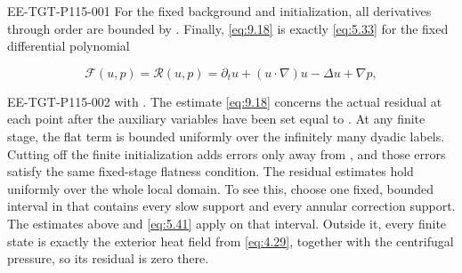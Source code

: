 %
\begin{EESegment}{EE-TGT-P115-001}
For the fixed background and initialization, all derivatives through order
 are bounded by
. Finally, \eqref{eq:9.18} is exactly
\eqref{eq:5.33} for the fixed differential polynomial
\end{EESegment}
\[
\mathcal F(u,p)=\mathscr R(u,p)=\partial_tu+(u\mathbin{\cdot}\nabla)u-\Delta u+\nabla p,
\]
\begin{EESegment}{EE-TGT-P115-002}
with . The estimate \eqref{eq:9.18} concerns
the actual residual at each point after the auxiliary variables have been set equal to
. At any finite stage, the flat term is bounded uniformly over the
infinitely many dyadic labels. Cutting off the finite initialization adds errors only away from
, and those errors satisfy the same fixed-stage flatness condition. The
residual estimates hold uniformly over the whole local domain. To see this, choose one fixed,
bounded interval in  that contains every slow support and every annular
correction support. The estimates above and \eqref{eq:5.41} apply on that interval. Outside it,
every finite state is exactly the exterior heat field from \eqref{eq:4.29}, together with the
centrifugal pressure, so its residual is zero there.
\end{EESegment}

